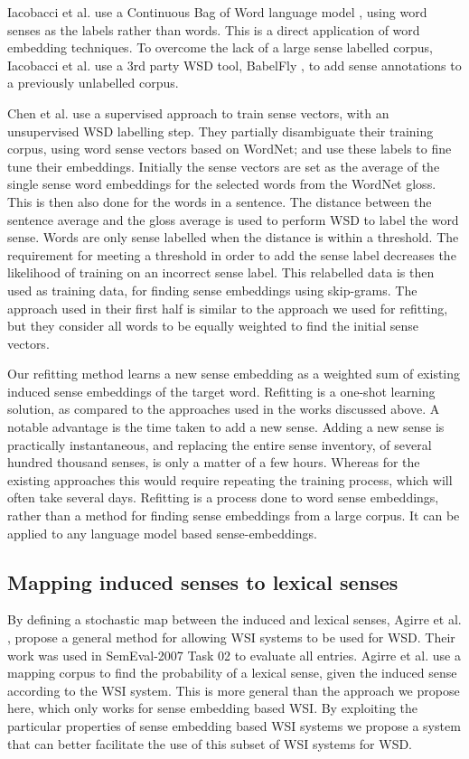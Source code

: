 \documentclass{llncs}
\def\parencite{\cite}
\begin{document}
Iacobacci et al. \parencite{iacobacci2015sensembed} use a Continuous Bag of Word language model \parencite{mikolov2013efficient}, using word senses as the labels rather than words.
This is a direct application of word embedding techniques.
To overcome the lack of a large sense labelled corpus, Iacobacci et al. use a 3rd party WSD tool, BabelFly \cite{Moroetal:14tacl}, to add sense annotations to a previously unlabelled corpus. 

Chen et al. \parencite{Chen2014} use a supervised approach to train sense vectors, with an unsupervised WSD labelling step.
They partially disambiguate their training corpus, using  word sense vectors based on WordNet; and use these labels to fine tune their embeddings.
Initially the sense vectors are set as the average of the single sense word embeddings \parencite{mikolov2013efficient} for the selected words from the WordNet gloss.
This is then also done for the words in a sentence.
The distance between the sentence average and the gloss average is used to perform WSD to label the word sense. Words are only sense labelled when the distance is within a threshold.
The requirement for meeting a threshold in order to add the sense label  decreases the likelihood of training on an incorrect sense label.
This relabelled data is then used as training data, for finding sense embeddings using skip-grams.
The approach used in their first half is similar to the approach we used for refitting, but they consider all words to be equally weighted to find the initial sense vectors.

Our refitting method learns a new sense embedding as a weighted sum of existing induced sense embeddings of the target word.
Refitting is a one-shot learning solution, as compared to the approaches used in the works discussed above.
A notable advantage is the time taken to add a new sense.
Adding a new sense is practically instantaneous, and replacing the entire sense inventory, of several hundred thousand senses, is only a matter of a few hours.
Whereas for the existing approaches this would require repeating the training process, which will often take several days.
Refitting is a process done to word sense embeddings, rather than a method for finding sense embeddings from a large corpus. 
It can be applied to any language model based sense-embeddings.


\subsection{Mapping induced senses to lexical senses}\label{mapping}
By defining a stochastic map between the induced and lexical senses, Agirre et al. \parencite{agirre2006}, propose a general method for allowing WSI systems to be used for WSD.
Their work was used in SemEval-2007 Task 02 \parencite{SemEval2007WSIandWSD} to evaluate all entries. 
Agirre et al. use a mapping corpus to find the probability of a lexical sense, given the induced sense according to the WSI system.
This is more general than the approach we propose here, which only works for sense embedding based WSI.
By exploiting the particular properties of sense embedding based WSI systems we propose a system that can better facilitate the use of this subset of WSI systems for WSD.
\end{document}
